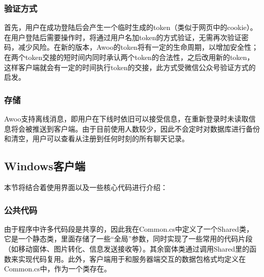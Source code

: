 \documentclass[a4paper,11pt]{article}
\begin{document}
        \subsubsection{验证方式}
            首先，用户在成功登陆后会产生一个临时生成的token（类似于网页中的cookie）。在用户登陆后需要操作时，将通过用户名加token的方式验证，无需再次验证密码，减少风险。在新的版本，Awoo的token将有一定的生命周期，以增加安全性；在两个token交接的短时间内同时承认两个token的合法性，之后改用新的token，这样客户端就会有一定的时间执行token的交接，此方式受微信公众号验证方式的启发\textsuperscript{\cite{4}}。
        \subsubsection{存储}
            Awoo支持离线消息，即用户在下线时依旧可以接受信息，在重新登录时未读取信息将会被推送到客户端。由于目前使用人数较少，因此不会定时对数据库进行备份和清空，用户可以查看从注册到任何时刻的所有聊天记录。

    \subsection{Windows客户端}
        本节将结合着使用界面以及一些核心代码进行介绍：
        \subsubsection{公共代码}
            由于程序中许多代码段是共享的，因此我在Common.cs中定义了一个Shared类，它是一个静态类，里面存储了一些“全局”参数，同时实现了一些常用的代码片段（如移动窗体、图片转化、信息发送接收等）。其余窗体类通过调用Shared里的函数来实现代码复用。此外，客户端用于和服务器端交互的数据包格式均定义在Common.cs中，作为一个类存在。
\end{document}
